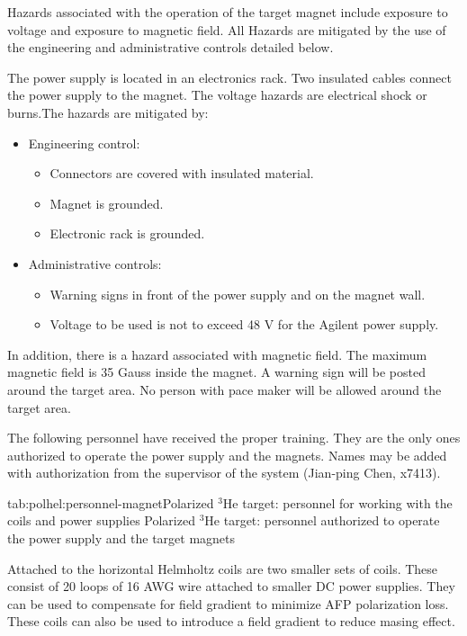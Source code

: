{Hazards associated with the operation of the target magnet include exposure 
to voltage and exposure to magnetic field. All Hazards are mitigated by the 
use of the engineering and administrative controls detailed below. 

The power supply is located in an electronics rack. Two insulated cables connect the power supply to the magnet. The voltage hazards are electrical shock or 
burns.The hazards are mitigated by:
\begin{itemize}
\item Engineering control:
 \begin{itemize}
 \item Connectors are covered with insulated material.
 \item Magnet is grounded.
 \item Electronic rack is grounded.
 \end{itemize}
\item Administrative controls:
 \begin{itemize}
 \item Warning signs in front of the power supply and on the magnet wall.
 \item Voltage to be used is not to exceed 48 V for the Agilent power supply.
 \end{itemize}
\end{itemize}

In addition, there is a hazard associated with magnetic field. The maximum
magnetic field is 35 Gauss inside the magnet. A warning sign will be posted 
around the target area. No person with pace maker will be allowed around the target area.

The following personnel have received the proper training. They are the only ones authorized to operate the power supply and the magnets. Names may be added with authorization from the supervisor of the system (Jian-ping Chen,  x7413).

\begin{namestab}{tab:polhel:personnel-magnet}{Polarized $^3$He target: personnel for working with the coils and power supplies}{%
   Polarized $^3$He target: personnel authorized to operate the power supply 
and
the target magnets}
   \ChiranjibDutta{}
   \JinHuang{}
   \JoeKatich{}
   \YiQiang{}
   \VinceSulkosky{}
   \YiZhang{}
\end{namestab}


Attached to the horizontal Helmholtz coils are two smaller sets of
 coils.  These consist of 20 loops of 16 AWG wire attached to smaller DC
 power supplies.  
They can be used to compensate for field gradient to minimize AFP
polarization loss.
These coils can also be used to introduce a field gradient to reduce 
masing effect.

} %
